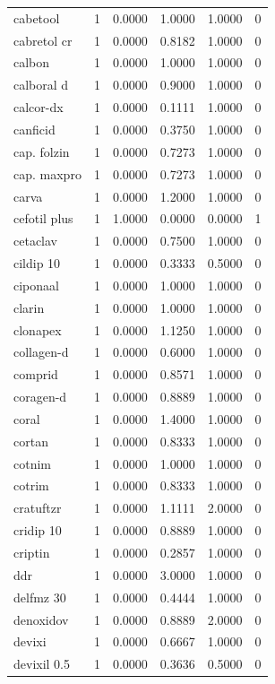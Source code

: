 \begin{longtable}{p{3.0cm}rrrrr}
cabetool & 1 & 0.0000 & 1.0000 & 1.0000 & 0 \\
cabretol cr & 1 & 0.0000 & 0.8182 & 1.0000 & 0 \\
calbon & 1 & 0.0000 & 1.0000 & 1.0000 & 0 \\
calboral d & 1 & 0.0000 & 0.9000 & 1.0000 & 0 \\
calcor-dx & 1 & 0.0000 & 0.1111 & 1.0000 & 0 \\
canficid & 1 & 0.0000 & 0.3750 & 1.0000 & 0 \\
cap. folzin & 1 & 0.0000 & 0.7273 & 1.0000 & 0 \\
cap. maxpro & 1 & 0.0000 & 0.7273 & 1.0000 & 0 \\
carva & 1 & 0.0000 & 1.2000 & 1.0000 & 0 \\
cefotil plus & 1 & 1.0000 & 0.0000 & 0.0000 & 1 \\
cetaclav & 1 & 0.0000 & 0.7500 & 1.0000 & 0 \\
cildip 10 & 1 & 0.0000 & 0.3333 & 0.5000 & 0 \\
ciponaal & 1 & 0.0000 & 1.0000 & 1.0000 & 0 \\
clarin & 1 & 0.0000 & 1.0000 & 1.0000 & 0 \\
clonapex & 1 & 0.0000 & 1.1250 & 1.0000 & 0 \\
collagen-d & 1 & 0.0000 & 0.6000 & 1.0000 & 0 \\
comprid & 1 & 0.0000 & 0.8571 & 1.0000 & 0 \\
coragen-d & 1 & 0.0000 & 0.8889 & 1.0000 & 0 \\
coral & 1 & 0.0000 & 1.4000 & 1.0000 & 0 \\
cortan & 1 & 0.0000 & 0.8333 & 1.0000 & 0 \\
cotnim & 1 & 0.0000 & 1.0000 & 1.0000 & 0 \\
cotrim & 1 & 0.0000 & 0.8333 & 1.0000 & 0 \\
cratuftzr & 1 & 0.0000 & 1.1111 & 2.0000 & 0 \\
cridip 10 & 1 & 0.0000 & 0.8889 & 1.0000 & 0 \\
criptin & 1 & 0.0000 & 0.2857 & 1.0000 & 0 \\
ddr & 1 & 0.0000 & 3.0000 & 1.0000 & 0 \\
delfmz 30 & 1 & 0.0000 & 0.4444 & 1.0000 & 0 \\
denoxidov & 1 & 0.0000 & 0.8889 & 2.0000 & 0 \\
devixi & 1 & 0.0000 & 0.6667 & 1.0000 & 0 \\
devixil 0.5 & 1 & 0.0000 & 0.3636 & 0.5000 & 0 \\

\end{longtable}
